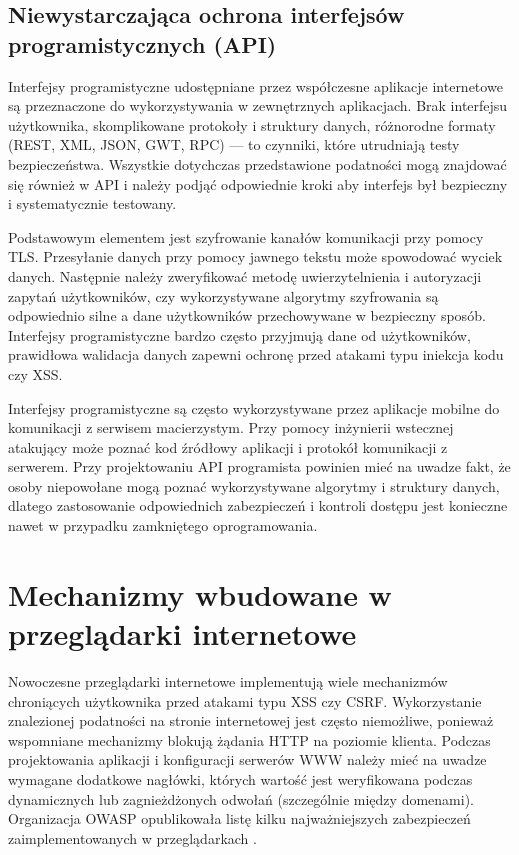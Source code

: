 \documentclass[11pt,a4paper,polish,thesis,oneside]{dcsbook}
\begin{document}
\subsection{Niewystarczająca ochrona interfejsów programistycznych (API)}
Interfejsy programistyczne udostępniane przez współczesne aplikacje internetowe są przeznaczone do wykorzystywania w zewnętrznych aplikacjach. Brak interfejsu użytkownika, skomplikowane protokoły i struktury danych, różnorodne formaty (REST, XML, JSON, GWT, RPC) --- to czynniki, które utrudniają testy bezpieczeństwa. Wszystkie dotychczas przedstawione podatności mogą znajdować się również w API i należy podjąć odpowiednie kroki aby interfejs był bezpieczny i systematycznie testowany.

Podstawowym elementem jest szyfrowanie kanałów komunikacji przy pomocy TLS. Przesyłanie danych przy pomocy jawnego tekstu może spowodować wyciek danych. Następnie należy zweryfikować metodę uwierzytelnienia i autoryzacji zapytań użytkowników, czy wykorzystywane algorytmy szyfrowania są odpowiednio silne a dane użytkowników przechowywane w bezpieczny sposób. Interfejsy programistyczne bardzo często przyjmują dane od użytkowników, prawidłowa walidacja danych zapewni ochronę przed atakami typu iniekcja kodu czy XSS.

Interfejsy programistyczne są często wykorzystywane przez aplikacje mobilne do komunikacji z serwisem macierzystym. Przy pomocy inżynierii wstecznej atakujący może poznać kod źródłowy aplikacji i protokół komunikacji z serwerem. Przy projektowaniu API programista powinien mieć na uwadze fakt, że osoby niepowołane mogą poznać wykorzystywane algorytmy i struktury danych, dlatego zastosowanie odpowiednich zabezpieczeń i kontroli dostępu jest konieczne nawet w przypadku zamkniętego oprogramowania.

\section{Mechanizmy wbudowane w przeglądarki internetowe}
Nowoczesne przeglądarki internetowe implementują wiele mechanizmów chroniących użytkownika przed atakami typu XSS czy CSRF. Wykorzystanie znalezionej podatności na stronie internetowej jest często niemożliwe, ponieważ wspomniane mechanizmy blokują żądania HTTP na poziomie klienta. Podczas projektowania aplikacji i konfiguracji serwerów WWW należy mieć na uwadze wymagane dodatkowe nagłówki, których wartość jest weryfikowana podczas dynamicznych lub zagnieżdżonych odwołań (szczególnie między domenami). Organizacja OWASP opublikowała listę kilku najważniejszych zabezpieczeń zaimplementowanych w przeglądarkach \cite{html5security}.
\end{document}

